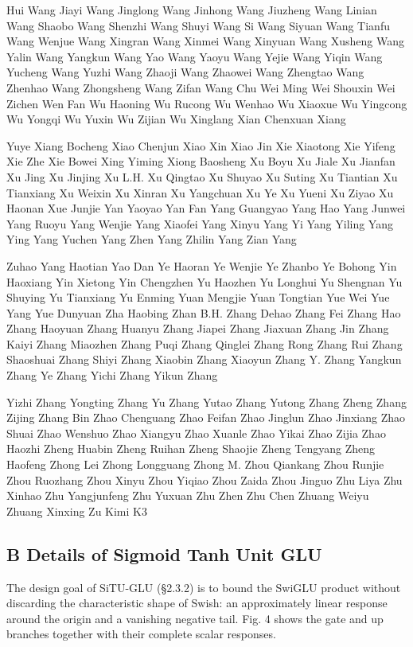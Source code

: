 \documentclass[
  10
]{article}
\begin{document}
Hui Wang Jiayi Wang Jinglong Wang Jinhong Wang Jiuzheng Wang Linian Wang
Shaobo Wang Shenzhi Wang Shuyi Wang Si Wang Siyuan Wang Tianfu Wang
Wenjue Wang Xingran Wang Xinmei Wang Xinyuan Wang Xusheng Wang Yalin
Wang Yangkun Wang Yao Wang Yaoyu Wang Yejie Wang Yiqin Wang Yucheng Wang
Yuzhi Wang Zhaoji Wang Zhaowei Wang Zhengtao Wang Zhenhao Wang
Zhongsheng Wang Zifan Wang Chu Wei Ming Wei Shouxin Wei Zichen Wen Fan
Wu Haoning Wu Rucong Wu Wenhao Wu Xiaoxue Wu Yingcong Wu Yongqi Wu Yuxin
Wu Zijian Wu Xinglang Xian Chenxuan Xiang

Yuye Xiang Bocheng Xiao Chenjun Xiao Xin Xiao Jin Xie Xiaotong Xie
Yifeng Xie Zhe Xie Bowei Xing Yiming Xiong Baosheng Xu Boyu Xu Jiale Xu
Jianfan Xu Jing Xu Jinjing Xu L.H. Xu Qingtao Xu Shuyao Xu Suting Xu
Tiantian Xu Tianxiang Xu Weixin Xu Xinran Xu Yangchuan Xu Ye Xu Yueni Xu
Ziyao Xu Haonan Xue Junjie Yan Yaoyao Yan Fan Yang Guangyao Yang Hao
Yang Junwei Yang Ruoyu Yang Wenjie Yang Xiaofei Yang Xinyu Yang Yi Yang
Yiling Yang Ying Yang Yuchen Yang Zhen Yang Zhilin Yang Zian Yang

Zuhao Yang Haotian Yao Dan Ye Haoran Ye Wenjie Ye Zhanbo Ye Bohong Yin
Haoxiang Yin Xietong Yin Chengzhen Yu Haozhen Yu Longhui Yu Shengnan Yu
Shuying Yu Tianxiang Yu Enming Yuan Mengjie Yuan Tongtian Yue Wei Yue
Yang Yue Dunyuan Zha Haobing Zhan B.H. Zhang Dehao Zhang Fei Zhang Hao
Zhang Haoyuan Zhang Huanyu Zhang Jiapei Zhang Jiaxuan Zhang Jin Zhang
Kaiyi Zhang Miaozhen Zhang Puqi Zhang Qinglei Zhang Rong Zhang Rui Zhang
Shaoshuai Zhang Shiyi Zhang Xiaobin Zhang Xiaoyun Zhang Y. Zhang Yangkun
Zhang Ye Zhang Yichi Zhang Yikun Zhang

Yizhi Zhang Yongting Zhang Yu Zhang Yutao Zhang Yutong Zhang Zheng Zhang
Zijing Zhang Bin Zhao Chenguang Zhao Feifan Zhao Jinglun Zhao Jinxiang
Zhao Shuai Zhao Wenshuo Zhao Xiangyu Zhao Xuanle Zhao Yikai Zhao Zijia
Zhao Haozhi Zheng Huabin Zheng Ruihan Zheng Shaojie Zheng Tengyang Zheng
Haofeng Zhong Lei Zhong Longguang Zhong M. Zhou Qiankang Zhou Runjie
Zhou Ruozhang Zhou Xinyu Zhou Yiqiao Zhou Zaida Zhou Jinguo Zhu Liya Zhu
Xinhao Zhu Yangjunfeng Zhu Yuxuan Zhu Zhen Zhu Chen Zhuang Weiyu Zhuang
Xinxing Zu Kimi K3

\subsection{B Details of Sigmoid Tanh Unit
GLU}\label{b-details-of-sigmoid-tanh-unit-glu}

The design goal of SiTU-GLU (§2.3.2) is to bound the SwiGLU product
without discarding the characteristic shape of Swish: an approximately
linear response around the origin and a vanishing negative tail. Fig. 4
shows the gate and up branches together with their complete scalar
responses.
\end{document}
